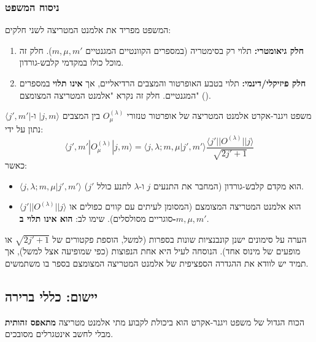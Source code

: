 \subsubsection{ניסוח המשפט}
המשפט מפריד את אלמנט המטריצה לשני חלקים:
\begin{enumerate}
    \item \textbf{חלק גיאומטרי:} תלוי רק בסימטריה (במספרים הקוונטיים המגנטיים $m, \mu, m'$). חלק זה מוכל כולו במקדמי קלבש-גורדון.
    \item \textbf{חלק פיזיקלי/דינמי:} תלוי בטבע האופרטור והמצבים הרדיאליים, אך \textbf{אינו תלוי} במספרים המגנטיים. חלק זה נקרא "אלמנט המטריצה המצומצם" ().
\end{enumerate}

\begin{resultbox}{משפט ויגנר-אקרט}
אלמנט המטריצה של אופרטור טנזורי $O_\mu^{(\lambda)}$ בין המצבים $|j, m\rangle$ ו-$\langle j', m'|$ נתון על ידי:
\begin{equation}
    \langle j', m' | O_\mu^{(\lambda)} | j, m \rangle = \langle j, \lambda; m, \mu | j', m' \rangle \frac{\langle j' || O^{(\lambda)} || j \rangle}{\sqrt{2j' + 1}}
\end{equation}
כאשר:
\begin{itemize}
    \item $\langle j, \lambda; m, \mu | j', m' \rangle$ הוא מקדם קלבש-גורדון (המחבר את התנעים $j$ ו-$\lambda$ לתנע כולל $j'$).
    \item $\langle j' || O^{(\lambda)} || j \rangle$ הוא אלמנט המטריצה המצומצם (המסומן לעיתים עם קווים כפולים או סוגריים מסולסלים). שימו לב: \textbf{הוא אינו תלוי ב-$m, \mu, m'$}.
\end{itemize}
\end{resultbox}

\begin{notebox}{הערה על סימונים}
ישנן קונבנציות שונות בספרות (למשל, הוספת פקטורים של $\sqrt{2j'+1}$ או מופעים של מינוס אחד). הנוסחה לעיל היא אחת הנפוצות (כפי שמופיעה אצל  למשל), אך תמיד יש לוודא את ההגדרה הספציפית של אלמנט המטריצה המצומצם בספר בו משתמשים.
\end{notebox}

\subsection{יישום: כללי ברירה }
הכוח הגדול של משפט ויגנר-אקרט הוא ביכולת לקבוע מתי אלמנט מטריצה \textbf{מתאפס זהותית} מבלי לחשב אינטגרלים מסובכים.

